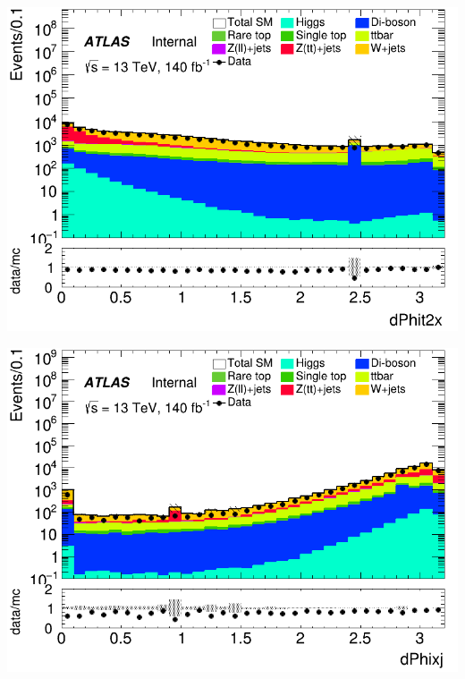 \documentclass[usenames,dvipsnames]{beamer}
\begin{document}
\begin{frame}
    \begin{minipage}{0.32\textwidth}
        \centering
        \includegraphics[width=\textwidth]{graphics/LH_met/LH_met_dPhit2x.png}
    \end{minipage}
    \hfill
    \begin{minipage}{0.32\textwidth}
        \centering
        \includegraphics[width=\textwidth]{graphics/LH_met/LH_met_dPhixj.png}
    \end{minipage}
    \hfill
    \begin{minipage}{0.32\textwidth}
        \centering

\end{minipage}
\end{frame}
\end{document}
